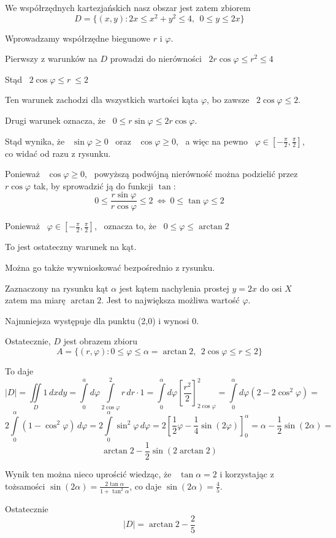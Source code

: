 \begin{przykladbig}
    We współrzędnych kartezjańskich nasz obszar jest zatem zbiorem
    \[ D = \{ (x,y): 2x \leq x^2 + y^2 \leq 4, \ \ 0 \leq y \leq 2x \} \]

    Wprowadzamy współrzędne biegunowe $r$ i $\varphi$.
    
    Pierwszy z warunków na $D$ prowadzi do nierówności \ $ 2r \cos \varphi \leq r^2 \leq 4 $

    Stąd \ $ 2 \cos \varphi \leq r \ \leq 2 $

    Ten warunek zachodzi dla wszystkich wartości kąta $\varphi$, bo zawsze \ $ 2\cos \varphi \leq 2 $.

    Drugi warunek oznacza, że \ $ 0 \leq r \sin \varphi \leq 2r \cos \varphi $.

    Stąd wynika, że \ $ \sin \varphi \geq 0 $ \ oraz \ $ \cos \varphi \geq 0 $, \ a więc na pewno \ $ \varphi \in \left[ -\frac{\pi}{2}, \frac{\pi}{2} \right] $,
    co widać od razu z rysunku.

    Ponieważ \ $ \cos \varphi \geq 0 $, \ powyższą podwójną nierówność można podzielić przez \ $ r \cos \varphi $ tak, by sprowadzić ją do funkcji $\tan$:
    \[ 0 \leq \frac{r \sin \varphi}{r \cos \varphi} \leq 2 \ \Leftrightarrow \ 0 \leq \tan \varphi \leq 2 \]

    Ponieważ \ $ \varphi \in \left[ -\frac{\pi}{2}, \frac{\pi}{2} \right] $, \ oznacza to, że \ $ 0 \leq \varphi \leq \arctan 2 $

    To jest ostateczny warunek na kąt.

    Można go także wywnioskować bezpośrednio z rysunku.

    Zaznaczony na rysunku kąt $\alpha$ jest kątem nachylenia prostej $y = 2x$ do osi $X$ zatem ma miarę $\arctan 2$.
    Jest to największa możliwa wartość $\varphi$.

    Najmniejsza występuje dla punktu (2,0) i wynosi 0.

    Ostatecznie, $D$ jest obrazem zbioru
    \[ A = \{ (r, \varphi): 0 \leq \varphi \leq \alpha = \arctan 2, \ \ 2 \cos \varphi \leq r \leq 2 \} \]

    To daje
    \[ |D| = \iint\limits_D 1\, dxdy = \int\limits_{0}^{a} d \varphi \int\limits_{2 \cos \varphi}^{2} r\, dr \cdot 1 =
    \int\limits_{0}^{\alpha} d\varphi \left[ \frac{r^2}{2} \right]_{2 \cos \varphi}^{2} = \int\limits_{0}^{\alpha} d\varphi (2 - 2\cos^2 \varphi) = \]
    \[ 2 \int\limits_{0}^{\alpha} (1 - \cos^2 \varphi) \, d\varphi = 2 \int\limits_{0}^{\alpha} \sin^2 \varphi \, d \varphi =
    2 \left[ \frac{1}{2} \varphi - \frac{1}{4} \sin (2\varphi) \right]_{0}^{\alpha} = \alpha  - \frac{1}{2} \sin (2\alpha) = \]
    \[ \arctan 2 - \frac{1}{2} \sin(2 \arctan 2) \]
    
    Wynik ten można nieco uprościć wiedząc, że \ $\tan \alpha = 2$ i korzystając z tożsamości $ \sin (2\alpha) = \frac{2 \tan \alpha}{1 + \tan^2 \alpha} $,
    co daje $ \sin (2\alpha) = \frac{4}{5} $. \medskip

    Ostatecznie
    \[ |D| = \arctan 2 - \frac{2}{5} \]
\end{przykladbig}

